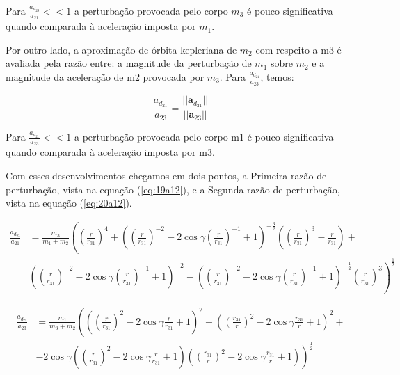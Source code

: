 Para $\frac{a_{d_{23}}}{a_{21}} << 1$ a perturbação provocada pelo corpo $m_3$ é pouco significativa quando comparada à aceleração imposta por $m_1$.


Por outro lado, a aproximação de órbita kepleriana de $m_2$ com respeito a m3 é avaliada pela razão entre: a magnitude da perturbação de $m_1$ sobre $m_2$ e a magnitude da aceleração de m2 provocada por $m_3$. Para $\frac{a_{d_{21}}}{a_{23}}$, temos:

\begin{equation}
\frac{a_{d_{21}}}{a_{23}} = \frac{||\textbf{a}_{d_{21}}||}{||\textbf{a}_{23}||}
\label{eq:18a12}
\end{equation}

Para $\frac{a_{d_{21}}}{a_{23}} << 1$ a perturbação provocada pelo corpo m1 é pouco significativa quando comparada à aceleração imposta por m3.

\par Com esses desenvolvimentos chegamos em dois pontos, a Primeira razão de perturbação, vista na equação (\ref{eq:19a12}), e a Segunda razão de perturbação, vista na equação (\ref{eq:20a12}).

\begin{equation}
\begin{aligned}
\frac{a_{d_{23}}}{a_{21}} & =\frac{m_3}{m_1+m_2}\left(\left(\frac{r}{r_{31}}\right)^4+\left(\left(\frac{r}{r_{31}}\right)^{-2}-2 \cos \gamma\left(\frac{r}{r_{31}}\right)^{-1}+1\right)^{-\frac{3}{2}}\left(\left(\frac{r}{r_{31}}\right)^3-\frac{r}{r_{31}}\right)+\right. \\
& \left.\left(\left(\frac{r}{r_{31}}\right)^{-2}-2 \cos \gamma\left(\frac{r}{r_{31}}\right)^{-1}+1\right)^{-2}-\left(\left(\frac{r}{r_{31}}\right)^{-2}-2 \cos \gamma\left(\frac{r}{r_{31}}\right)^{-1}+1\right)^{-\frac{1}{2}}\left(\frac{r}{r_{31}}\right)^3\right)^{\frac{1}{2}}
\label{eq:19a12}
\end{aligned}
\end{equation}

\begin{equation}
\begin{aligned}
\frac{a_{d_{21}}}{a_{23}} & =\frac{m_1}{m_3+m_2}\left(\left(\left(\frac{r}{r_{31}}\right)^2-2 \cos \gamma \frac{r}{r_{31}}+1\right)^2+\left(\left(\frac{r_{31}}{r}\right)^2-2 \cos \gamma \frac{r_{31}}{r}+1\right)^2+\right. \\
& \left.-2 \cos \gamma\left(\left(\frac{r}{r_{31}}\right)^2-2 \cos \gamma \frac{r}{r_{31}}+1\right)\left(\left(\frac{r_{31}}{r}\right)^2-2 \cos \gamma \frac{r_{31}}{r}+1\right)\right)^{\frac{1}{2}}
\label{eq:20a12}
\end{aligned}
\end{equation}


